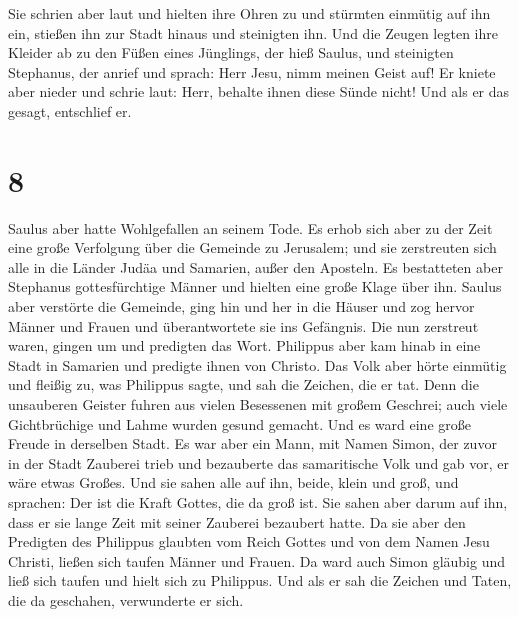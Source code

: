  Sie schrien aber laut und hielten ihre Ohren zu und
stürmten einmütig auf ihn ein, stießen ihn zur Stadt hinaus und
steinigten ihn.  Und die Zeugen legten ihre Kleider ab zu
den Füßen eines Jünglings, der hieß Saulus,  und
steinigten Stephanus, der anrief und sprach: Herr Jesu, nimm meinen
Geist auf!  Er kniete aber nieder und schrie laut: Herr,
behalte ihnen diese Sünde nicht! Und als er das gesagt, entschlief er.

\hypertarget{section-7}{%
\section{8}\label{section-7}}

 Saulus aber hatte Wohlgefallen an seinem Tode. Es erhob
sich aber zu der Zeit eine große Verfolgung über die Gemeinde zu
Jerusalem; und sie zerstreuten sich alle in die Länder Judäa und
Samarien, außer den Aposteln.  Es bestatteten aber
Stephanus gottesfürchtige Männer und hielten eine große Klage über ihn.
 Saulus aber verstörte die Gemeinde, ging hin und her in
die Häuser und zog hervor Männer und Frauen und überantwortete sie ins
Gefängnis.  Die nun zerstreut waren, gingen um und
predigten das Wort.  Philippus aber kam hinab in eine
Stadt in Samarien und predigte ihnen von Christo.  Das
Volk aber hörte einmütig und fleißig zu, was Philippus sagte, und sah
die Zeichen, die er tat.  Denn die unsauberen Geister
fuhren aus vielen Besessenen mit großem Geschrei; auch viele
Gichtbrüchige und Lahme wurden gesund gemacht.  Und es
ward eine große Freude in derselben Stadt.  Es war aber
ein Mann, mit Namen Simon, der zuvor in der Stadt Zauberei trieb und
bezauberte das samaritische Volk und gab vor, er wäre etwas Großes.
 Und sie sahen alle auf ihn, beide, klein und groß, und
sprachen: Der ist die Kraft Gottes, die da groß ist.  Sie
sahen aber darum auf ihn, dass er sie lange Zeit mit seiner Zauberei
bezaubert hatte.  Da sie aber den Predigten des Philippus
glaubten vom Reich Gottes und von dem Namen Jesu Christi, ließen sich
taufen Männer und Frauen.  Da ward auch Simon gläubig und
ließ sich taufen und hielt sich zu Philippus. Und als er sah die Zeichen
und Taten, die da geschahen, verwunderte er sich.

